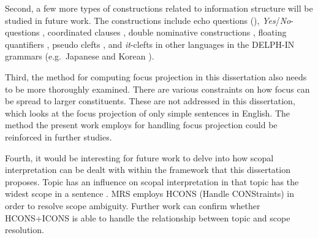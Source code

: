 

Second, a few more types of constructions related to information
structure will be studied in future work.  The constructions include
echo questions (),
\textit{Yes}/\textit{No}-questions \citep{king:95}, coordinated
clauses \citep{heycock:07}, double nominative constructions
\citep{kim:sells:07,choi:12}, floating quantifiers
\citep{yoshimoto:etal:06,kim:11b}, pseudo clefts \citep{kim:07}, and
\textit{it}-clefts in other languages in the DELPH-IN grammars
(e.g.\ Japanese \citep{hiraiwa:ishihara:02,kizu:05} and Korean
\citep{kim:yang:09}).


Third, the method for computing focus projection in this dissertation
also needs to be more thoroughly examined. There are various
constraints on how focus can be spread to larger constituents. These
are not addressed in this dissertation, which looks at the focus
projection of only simple sentences in English. The method the present
work employs for handling focus projection could be reinforced in
further studies.


Fourth, it would be interesting for future work to delve into how
scopal interpretation can be dealt with within the framework that this
dissertation proposes.  Topic has an influence on scopal
interpretation in that topic has the widest scope in a sentence
\citep{buring:97,portner:yabushita:98,erteschik:07}.  MRS employs
HCONS (Handle CONStraints) in order to resolve scope
ambiguity. Further work can confirm whether HCONS+ICONS is able to
handle the relationship between topic and scope resolution.



